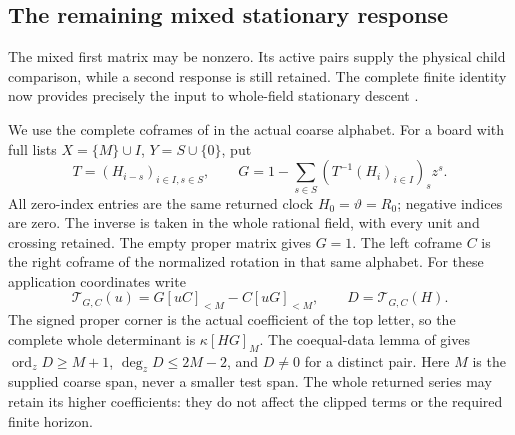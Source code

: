 \documentclass[11pt,a4paper]{amsart}
\numberwithin{equation}{section}
\theoremstyle{plain}
\theoremstyle{definition}
\newcommand{\ord}{\operatorname{ord}}
\begin{document}
\subsection{The remaining mixed stationary response}
The mixed first matrix may be nonzero.  Its active pairs supply the
physical child comparison, while a second response is still retained.
The complete finite identity now provides precisely the input to
whole-field stationary descent \cite{Shields2026Coframes}.

We use the complete coframes of \cite{Shields2026Coframes} in the actual
coarse alphabet.  For a board with full lists
\(X=\{M\}\cup I\), \(Y=S\cup\{0\}\), put
\[
 T=(H_{i-s})_{i\in I,s\in S},\qquad
 G=1-\sum_{s\in S}(T^{-1}(H_i)_{i\in I})_s z^s.
\]
All zero-index entries are the same returned clock
\(H_0=\vartheta=R_0\); negative indices are zero.  The inverse is taken
in the whole rational field, with every unit and crossing retained.
The empty proper matrix gives \(G=1\).  The left coframe \(C\) is the
right coframe of the normalized rotation in that same alphabet.
For these application coordinates write
\begin{equation}\label{ph:coframe-operator}
 \mathcal T_{G,C}(u)=G[uC]_{<M}-C[uG]_{<M},\qquad
 D=\mathcal T_{G,C}(H).
\end{equation}
The signed proper corner is the actual coefficient of the top letter,
so the complete whole determinant is \(\kappa[HG]_M\).
The coequal-data lemma of \cite{Shields2026Coframes} gives
\(\ord_zD\ge M+1\), \(\deg_zD\le2M-2\), and \(D\ne0\) for a distinct
pair.  Here \(M\) is the supplied coarse span, never a smaller test
span.  The whole returned series may retain its higher coefficients:
they do not affect the clipped terms or the required finite horizon.
\end{document}
